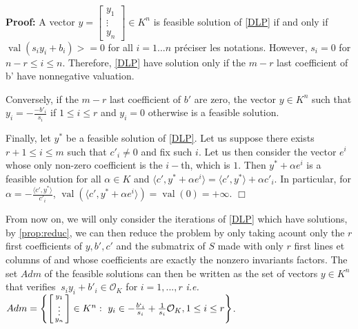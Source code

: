 \documentclass[a4paper,12pt]{article}
\newenvironment{proof}{\hbox{}\vspace{-0.8cm} {\bf Proof:}}{\hfill $\Box$}
\newcommand{\corentin}[1]{{\color{red} #1}} %
\DeclareMathOperator{\val}{val}
\newcommand{\OK}{\mathcal{O}_K}
\begin{document}
\begin{proof}
  A vector $y =  \left[\begin{smallmatrix} y_1 \\ \vdots \\ y_n \end{smallmatrix}\right] \in K^n$ is feasible solution of \ref{DLP} if and only if $\val(s_i y_i + b_i) >=0$ for all $i = 1...n$ \corentin{préciser les notations}. 
  However, $s_i =0$ for $n-r \leq i\leq n$. Therefore, \ref{DLP} have solution only if the $m-r$ last coefficient of b' have nonnegative valuation.
  
  Conversely, if the $m-r$ last coefficient of $b'$ are zero, the vector $y \in K^n$ such that $y_i = -\frac{-b'_i}{s_i}$ if $1 \leq i \leq r$ and $y_i =0$ otherwise is a feasible solution.

  Finally, let $y^*$ be a feasible solution of \ref{DLP}. Let us suppose there exists $r+1 \leq i \leq m$ such that $c'_i \neq  0$ and fix such $i$. Let us then consider the vector $e^i$ whose only non-zero coefficient is the $i-$th, which is $1$. Then $y^*+\alpha e^i$ is a feasible solution for all $\alpha \in K$ and $\langle c', y^* + \alpha e^i\rangle = \langle c' , y^* \rangle + \alpha c'_i$. In particular, for $\alpha = -\frac{\langle c', y^* \rangle}{c'_i}$, $\val \left( \langle c', y^* + \alpha e ^i \rangle\right) = \val (0) = + \infty$. 
\end{proof}

From now on, we will only consider the iterations of \ref{DLP} which have solutions, by \ref{prop:reduc}, we can then reduce the problem by only taking acount only the $r$ first coefficients of $y, b', c'$ and the submatrix of $S$ made with only $r$ first lines et columns of and whose coefficients are exactly the nonzero invariants factors. 
The set $Adm$ of the feasible solutions can then be written as the set of vectors $y \in K^n$ that verifies $ \ s_i y_i + b'_i \in \OK$ for $i=1,...,r$ {\it i.e.} $Adm = \left\{\left[\begin{smallmatrix} y_1\\ \vdots\\ y_n \end{smallmatrix}\right] \in K^n :\ y_i \in -\frac{b`_i}{s_i} + \frac{1}{s_i} \OK, 1\le i\le r\right\}$.
\end{document}
